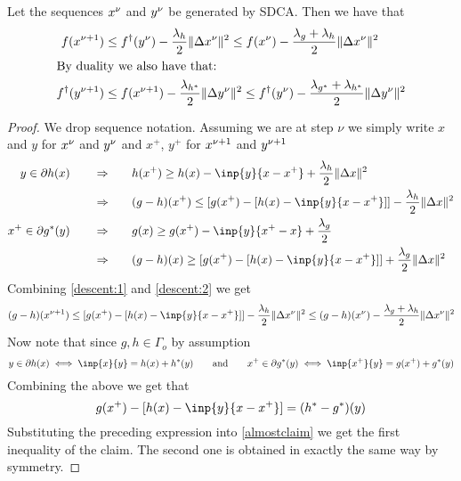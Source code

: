 \begin{theorem}
  Let the sequences $x^\nu$ and $y^{\nu}$ be generated by SDCA. Then we have  that
  \begin{align}
    f(x^{\nu+1}) &\leq f^\dagger (y^{\nu}) -\frac{\lambda_h}{2}\lVert\Delta x^\nu\rVert^2 
      \leq f(x^\nu) - \frac{\lambda_g + \lambda_h}{2}\lVert\Delta x^\nu\rVert^2\\
  \intertext{By duality we also have that:}
  f^\dagger(y^{\nu+1}) &\leq f (x^{\nu+1}) -\frac{\lambda_{h^*}}{2}\lVert\Delta y^{\nu}\rVert^2 
      \leq f^\dagger(y^{\nu}) - \frac{\lambda_{g^*} + \lambda_{h^*}}{2}\lVert\Delta y^{\nu}\rVert^2
  \end{align}
\begin{proof}
We drop sequence notation. Assuming we are at step $\nu$ 
we simply write $x$ and $y$ for $x^\nu$ and $y^{\nu}$ 
and $x^+$, $y^+$ for $x^{\nu+1}$ and $y^{\nu+1}$
\begin{align}
y\in\partial h(x)\qquad
  \nonumber \Rightarrow \qquad& h(x^+) \geq h(x) - \inp{y}{x-x^+} + \frac{\lambda_h}{2}\norm{\Delta x}^2\\
  \qquad \Rightarrow \qquad & (g-h)(x^+) \leq [g(x^+) - [h(x)-\inp{y}{x-x^+}]] - \frac{\lambda_h}{2}\norm{\Delta x}^2
  \label{descent:1}\\
  x^+\in\partial g^*(y) \qquad
  \nonumber \Rightarrow \qquad& g(x) \geq g(x^+) - \inp{y}{x^+-x} + \frac{\lambda_g}{2}\\
  \qquad \Rightarrow \qquad& (g-h)(x) \geq [g(x^+) - [h(x)-\inp{y}{x-x^+}]]+\frac{\lambda_g}{2}\norm{\Delta x}^2
  \label{descent:2}
\end{align}
Combining \eqref{descent:1} and \eqref{descent:2} we get 
\begin{equation}
  (g-h)(\xss) \leq [g(x^+) - [h(x)-\inp{y}{x-x^+}]]-\frac{\lambda_h}{2}\norm{\Delta \xs}^2
  \leq (g-h)(\xs) - \frac{\lambda_g + \lambda_h}{2}\norm{\Delta \xs}^2 \label{almostclaim}
\end{equation}
Now note that since $g,h\in \Gamma_o$ by assumption
\begin{equation}
  y\in\partial h(x) \iff \inp{x}{y}=h(x)+h^*(y) \qquad \text{and} \qquad 
  x^+\in\partial g^*(y) \iff \inp{x^+}{y}=g(x^+)+g^*(y)
\end{equation}
Combining the above we get that 
\begin{equation}
  g(x^+)-[h(x)-\inp{y}{x-x^+}]=(h^*-g^*)(y)
\end{equation}
Substituting the preceding expression into \eqref{almostclaim} we get the first inequality 
of the claim. The second one is obtained in exactly the same way by symmetry.
\end{proof}
\end{theorem}
\newpage

